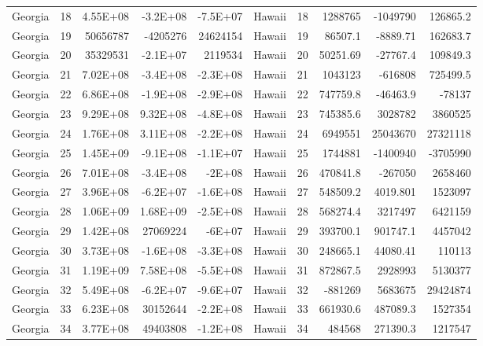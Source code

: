 \begin{table}[]
\begin{tabular}{lrrrrlrrrr}
		Georgia &  18 & 4.55E+08 & -3.2E+08 & -7.5E+07 & Hawaii &  18 & 1288765 & -1049790 & 126865.2 \\
		Georgia &  19 & 50656787 & -4205276 & 24624154 & Hawaii &  19 & 86507.1 & -8889.71 & 162683.7 \\
		Georgia &  20 & 35329531 & -2.1E+07 & 2119534 & Hawaii &  20 & 50251.69 & -27767.4 & 109849.3 \\
		Georgia &  21 & 7.02E+08 & -3.4E+08 & -2.3E+08 & Hawaii &  21 & 1043123 & -616808 & 725499.5 \\
		Georgia &  22 & 6.86E+08 & -1.9E+08 & -2.9E+08 & Hawaii &  22 & 747759.8 & -46463.9 & -78137 \\
		Georgia &  23 & 9.29E+08 & 9.32E+08 & -4.8E+08 & Hawaii &  23 & 745385.6 & 3028782 & 3860525 \\
		Georgia &  24 & 1.76E+08 & 3.11E+08 & -2.2E+08 & Hawaii &  24 & 6949551 & 25043670 & 27321118 \\
		Georgia &  25 & 1.45E+09 & -9.1E+08 & -1.1E+07 & Hawaii &  25 & 1744881 & -1400940 & -3705990 \\
		Georgia &  26 & 7.01E+08 & -3.4E+08 & -2E+08 & Hawaii &  26 & 470841.8 & -267050 & 2658460 \\
		Georgia &  27 & 3.96E+08 & -6.2E+07 & -1.6E+08 & Hawaii &  27 & 548509.2 & 4019.801 & 1523097 \\
		Georgia &  28 & 1.06E+09 & 1.68E+09 & -2.5E+08 & Hawaii &  28 & 568274.4 & 3217497 & 6421159 \\
		Georgia &  29 & 1.42E+08 & 27069224 & -6E+07 & Hawaii &  29 & 393700.1 & 901747.1 & 4457042 \\
		Georgia &  30 & 3.73E+08 & -1.6E+08 & -3.3E+08 & Hawaii &  30 & 248665.1 & 44080.41 & 110113 \\
		Georgia &  31 & 1.19E+09 & 7.58E+08 & -5.5E+08 & Hawaii &  31 & 872867.5 & 2928993 & 5130377 \\
		Georgia &  32 & 5.49E+08 & -6.2E+07 & -9.6E+07 & Hawaii &  32 & -881269 & 5683675 & 29424874 \\
		Georgia &  33 & 6.23E+08 & 30152644 & -2.2E+08 & Hawaii &  33 & 661930.6 & 487089.3 & 1527354 \\
		Georgia &  34 & 3.77E+08 & 49403808 & -1.2E+08 & Hawaii &  34 & 484568 & 271390.3 & 1217547
	\end{tabular}
\end{table}

